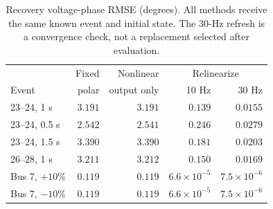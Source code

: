 \begin{table}[t]\centering\small
\caption{Recovery voltage-phase RMSE (degrees). All methods receive the same known event and initial state. The 30-Hz refresh is a convergence check, not a replacement selected after evaluation.}
\label{tab:relinearized-recovery}
\setlength{\tabcolsep}{3.1pt}
\begin{tabular}{lrrrr}
\toprule
&Fixed&Nonlinear&\multicolumn{2}{c}{Relinearize}\\
Event&polar&output only&10 Hz&30 Hz\\
\midrule
23--24, 1 s&$3.191$&$3.191$&$0.139$&$0.0155$\\
23--24, 0.5 s&$2.542$&$2.541$&$0.246$&$0.0279$\\
23--24, 1.5 s&$3.390$&$3.390$&$0.181$&$0.0203$\\
26--28, 1 s&$3.211$&$3.212$&$0.150$&$0.0169$\\
Bus 7, $+10\%$&$0.119$&$0.119$&$6.6\times10^{-5}$&$7.5\times10^{-6}$\\
Bus 7, $-10\%$&$0.119$&$0.119$&$6.6\times10^{-5}$&$7.5\times10^{-6}$\\
\bottomrule\end{tabular}
\end{table}
